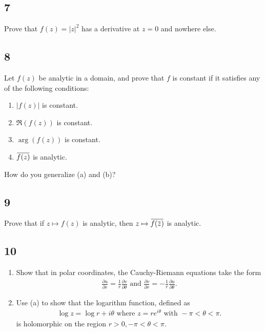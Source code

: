 \hypertarget{section-32}{%
\subsection{7}\label{section-32}}

Prove that \(f(z) = {\left\lvert {z} \right\rvert}^2\) has a derivative
at \(z=0\) and nowhere else.

\hypertarget{section-33}{%
\subsection{8}\label{section-33}}

Let \(f(z)\) be analytic in a domain, and prove that \(f\) is constant
if it satisfies any of the following conditions:

\begin{enumerate}
\def\labelenumi{\alph{enumi}.}
\tightlist
\item
  \({\left\lvert {f(z)} \right\rvert}\) is constant.
\item
  \(\Re(f(z))\) is constant.
\item
  \(\arg(f(z))\) is constant.
\item
  \(\mkern 1.5mu\overline{\mkern-1.5muf(z)\mkern-1.5mu}\mkern 1.5mu\) is
  analytic.
\end{enumerate}

How do you generalize (a) and (b)?

\hypertarget{section-34}{%
\subsection{9}\label{section-34}}

Prove that if \(z\mapsto f(z)\) is analytic, then
\(z \mapsto \mkern 1.5mu\overline{\mkern-1.5muf(\mkern 1.5mu\overline{\mkern-1.5muz\mkern-1.5mu}\mkern 1.5mu)\mkern-1.5mu}\mkern 1.5mu\)
is analytic.

\hypertarget{section-35}{%
\subsection{10}\label{section-35}}

\begin{enumerate}
\def\labelenumi{\alph{enumi}.}
\item
  Show that in polar coordinates, the Cauchy-Riemann equations take the
  form
  \begin{align*}
    \frac{\partial u}{\partial r}=\frac{1}{r} \frac{\partial v}{\partial \theta} \text { and } \frac{\partial v}{\partial r}=-\frac{1}{r} \frac{\partial u}{\partial \theta}
    .\end{align*}
\item
  Use (a) to show that the logarithm function, defined as
  \begin{align*}
    \log z=\log r+i \theta \text { where } z=r e^{i \theta} \text { with }-\pi<\theta<\pi
    .\end{align*}
  is holomorphic on the region \(r> 0, -\pi < \theta < \pi\).
\end{enumerate}

